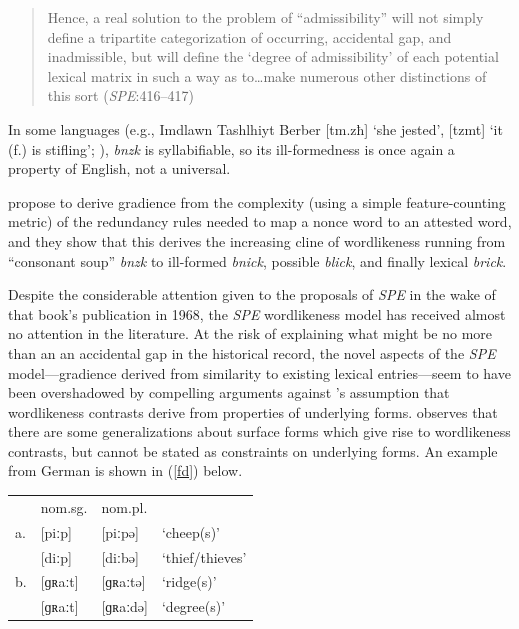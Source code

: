\begin{quote}
Hence, a real solution to the problem of ``admissibility'' will not simply define a tripartite categorization of occurring, accidental gap, and inadmissible, but will define the `degree of admissibility' of each potential lexical matrix in such a way as to\ldots{}make numerous other distinctions of this sort (\emph{SPE}:416--417)
\end{quote}

In some languages (e.g., Imdlawn Tashlhiyt Berber [tm.zħ] `she jested', [tzmt] `it (f.) is stifling'; \citealt{Dell1985}), \emph{bnzk} is syllabifiable, so its ill-formedness is once again a property of English, not a universal.

\citeauthor{SPE} propose to derive gradience from the complexity (using a simple feature-counting metric) of the redundancy rules needed to map a nonce word to an attested word, and they show that this derives the increasing cline of wordlikeness running from ``consonant soup'' \emph{bnzk} to ill-formed \emph{bnick}, possible \emph{blick}, and finally lexical \emph{brick}.

Despite the considerable attention given to the proposals of \emph{SPE} in the wake of that book's publication in 1968, the \emph{SPE} wordlikeness model has received almost no attention in the literature. At the risk of explaining what might be no more than an an accidental gap in the historical record, the novel aspects of the \emph{SPE} model---gradience derived from similarity to existing lexical entries---seem to have been overshadowed by compelling arguments against \citeauthor{SPE}'s assumption \citep[see also][]{Halle1962,Stanley1967} that wordlikeness contrasts derive from properties of underlying forms. \citet{Shibatani1973} observes that there are some generalizations about surface forms which give rise to wordlikeness contrasts, but cannot be stated as constraints on underlying forms. An example from German is shown in (\ref{fd}) below.

\begin{example} \label{fd}
\begin{tabular}{l l l l}
   & nom.sg. & nom.pl.    \\
a. & [piːp]    & [piːpə]  & `cheep(s)'      \\
   & [diːp]    & [diːbə]  & `thief/thieves' \\
b. & [ɡʀaːt]   & [ɡʀaːtə] & `ridge(s)'      \\
   & [ɡʀaːt]   & [ɡʀaːdə] & `degree(s)'     \\
\end{tabular}
\end{example}

